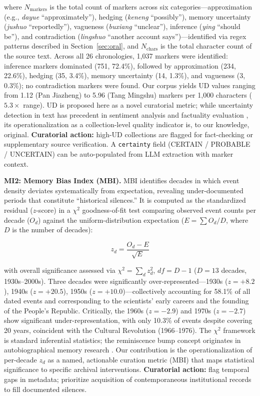 \documentclass[review]{elsarticle}
\begin{document}
where $N_{\text{markers}}$ is the total count of markers across six categories---approximation (e.g., \textit{dayue} ``approximately''), hedging (\textit{keneng} ``possibly''), memory uncertainty (\textit{jushuo} ``reportedly''), vagueness (\textit{buxiang} ``unclear''), inference (\textit{ying} ``should be''), and contradiction (\textit{lingshuo} ``another account says'')---identified via regex patterns described in Section~\ref{sec:oral}, and $N_{\text{chars}}$ is the total character count of the source text. Across all 26 chronologies, 1,037 markers were identified: inference markers dominated (751, 72.4\%), followed by approximation (234, 22.6\%), hedging (35, 3.4\%), memory uncertainty (14, 1.3\%), and vagueness (3, 0.3\%); no contradiction markers were found. Our corpus yields UD values ranging from 1.12 (Pan Jiazheng) to 5.96 (Tang Mingshu) markers per 1,000 characters ($5.3\times$ range). UD is proposed here as a novel curatorial metric; while uncertainty detection in text has precedent in sentiment analysis and factuality evaluation \cite{griffin2014text}, its operationalization as a collection-level quality indicator is, to our knowledge, original. \textbf{Curatorial action:} high-UD collections are flagged for fact-checking or supplementary source verification. A \texttt{certainty} field (CERTAIN / PROBABLE / UNCERTAIN) can be auto-populated from LLM extraction with marker context.

\textbf{MI2: Memory Bias Index (MBI).} MBI identifies decades in which event density deviates systematically from expectation, revealing under-documented periods that constitute ``historical silences.'' It is computed as the standardized residual ($z$-score) in a $\chi^2$ goodness-of-fit test comparing observed event counts per decade ($O_d$) against the uniform-distribution expectation ($E = \sum O_d / D$, where $D$ is the number of decades):

\begin{equation}
z_d = \frac{O_d - E}{\sqrt{E}}
\end{equation}

with overall significance assessed via $\chi^2 = \sum_d z_d^2$, $df = D - 1$ ($D = 13$ decades, 1930s--2000s). Three decades were significantly over-represented---1930s ($z = +8.2$), 1940s ($z = +20.5$), 1950s ($z = +10.0$)---collectively accounting for 58.1\% of all dated events and corresponding to the scientists' early careers and the founding of the People's Republic. Critically, the 1960s ($z = -2.9$) and 1970s ($z = -2.7$) show significant under-representation, with only 10.3\% of events despite covering 20 years, coincident with the Cultural Revolution (1966--1976). The $\chi^2$ framework is standard inferential statistics; the reminiscence bump concept originates in autobiographical memory research \cite{rubin1986autobiographical}. Our contribution is the operationalization of per-decade $z_d$ as a named, actionable curation metric (MBI) that maps statistical significance to specific archival interventions. \textbf{Curatorial action:} flag temporal gaps in metadata; prioritize acquisition of contemporaneous institutional records to fill documented silences.
\end{document}
